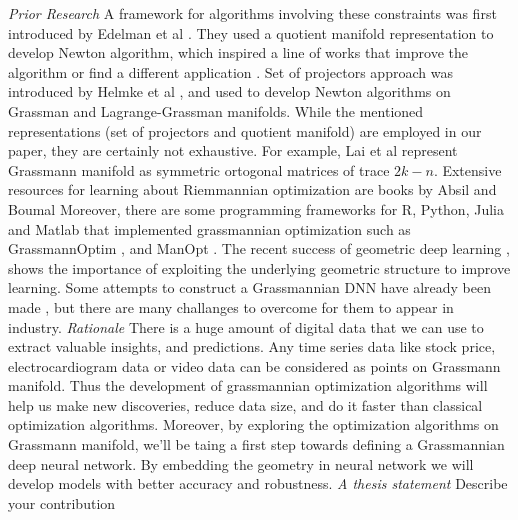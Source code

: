 \documentclass[11pt,a4paper]{report}
\begin{document}
\textit{Prior Research} \newline
A framework for algorithms involving these constraints was first introduced by Edelman et al \cite{edelman_geometry_1998} .
They used a quotient manifold representation to develop Newton algorithm, which inspired a line of works that improve the algorithm or find a different application \cite{hamm_grassmann_nodate} \cite{ma_flag_2020} \cite{johnsson_optimization_nodate} \cite{tripuraneni_averaging_2018}.
Set of projectors approach was introduced by Helmke et al \cite{helmke_newtons_2007}, and used to develop Newton algorithms on Grassman and Lagrange-Grassman manifolds.
While the mentioned representations (set of projectors and quotient manifold) are employed in our paper, they are certainly not exhaustive.
For example, Lai et al \cite{lai_simpler_2020} represent Grassmann manifold as symmetric ortogonal matrices of trace $2k -n$.
Extensive resources for learning about Riemmannian optimization are books by Absil \cite{AbsMahSep2008} and Boumal \cite{boumal2022intromanifolds}
Moreover, there are some programming frameworks for R, Python, Julia and Matlab that implemented grassmannian optimization such as GrassmannOptim \cite{adragni_grassmannoptim_2012}, and ManOpt \cite{JMLR:v17:16-177}.
The recent success of geometric deep learning \cite{DBLP:journals/corr/abs-2104-13478} \cite{masci_geodesic_2018}, 
shows the importance of exploiting the underlying geometric structure to improve learning.
Some attempts to construct a Grassmannian DNN have already been made \cite{zhang_grassmannian_2018} \cite{huang_building_2018}, but there are many challanges to overcome for them to appear in industry.
\textit{Rationale} \newline
There is a huge amount of digital data that we can use to extract valuable insights, and predictions.
Any time series data like stock price, electrocardiogram data or video data can be considered as points on Grassmann manifold.
Thus the development of grassmannian optimization algorithms will help us make new discoveries, reduce data size, and do it faster than classical optimization algorithms.
Moreover, by exploring the optimization algorithms on Grassmann manifold, we'll be taing a first step towards defining a Grassmannian deep neural network.
By embedding the geometry in neural network we will develop models with better accuracy and robustness. 
\newline
\textit{A thesis statement} \newline
Describe your contribution
\end{document}
